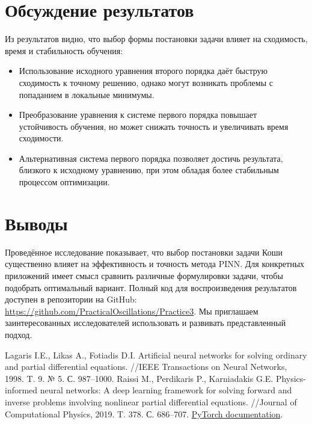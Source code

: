 \documentclass[12pt,a4paper]{article}
\begin{document}
\section{Обсуждение результатов}
Из результатов видно, что выбор формы постановки задачи влияет на сходимость, время и стабильность обучения:
\begin{itemize}
    \item Использование исходного уравнения второго порядка даёт быструю сходимость к точному решению, однако могут возникать проблемы с попаданием в локальные минимумы.
    \item Преобразование уравнения к системе первого порядка повышает устойчивость обучения, но может снижать точность и увеличивать время сходимости.
    \item Альтернативная система первого порядка позволяет достичь результата, близкого к исходному уравнению, при этом обладая более стабильным процессом оптимизации.
\end{itemize}

\section{Выводы}
Проведённое исследование показывает, что выбор постановки задачи Коши существенно влияет на эффективность и точность метода PINN. Для конкретных приложений имеет смысл сравнить различные формулировки задачи, чтобы подобрать оптимальный вариант. Полный код для воспроизведения результатов доступен в репозитории на GitHub: \href{https://github.com/PracticalOscillations/Practice3}{https://github.com/PracticalOscillations/Practice3}. Мы приглашаем заинтересованных исследователей использовать и развивать представленный подход.

\begin{thebibliography}{99}
 Lagaris I.E., Likas A., Fotiadis D.I. Artificial neural networks for solving ordinary and partial differential equations. //IEEE Transactions on Neural Networks, 1998. T. 9. № 5. С. 987–1000.
 Raissi M., Perdikaris P., Karniadakis G.E. Physics-informed neural networks: A deep learning framework for solving forward and inverse problems involving nonlinear partial differential equations. //Journal of Computational Physics, 2019. T. 378. С. 686–707.
 \href{https://pytorch.org/docs/stable/index.html}{PyTorch documentation}.
\end{thebibliography}
\end{document}
